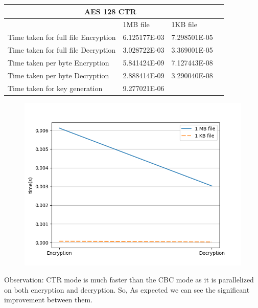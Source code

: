 \documentclass[12pt]{article}%
\begin{document}
\begin{tabular}{ |p{8cm}|p{3cm}|p{3cm}|p{3cm} }
 \hline
 \multicolumn{3}{|c|}{AES 128 CTR} \\
 \hline
	 & 1MB file & 1KB file\\
 \hline
 Time taken for full file Encryption   & 6.125177E-03    & 7.298501E-05  \\
  \hline
 Time taken for full file Decryption &  3.028722E-03  &  3.369001E-05	\\
 \hline
 Time taken per byte Encryption   & 5.841424E-09    &  7.127443E-08 \\
  \hline
 Time taken per byte Decryption & 2.888414E-09  & 	3.290040E-08\\
 \hline
 Time taken for key generation &  9.277021E-06  & 	\\
 \hline
\end{tabular}
\begin{figure}[h]
    \centering
	\includegraphics[scale=0.5]{q1b}
\end{figure}

Observation: CTR mode is much faster than the CBC mode as it is parallelized on both encryption and decryption. So, As expected we can see the significant improvement between them.
\end{document}
